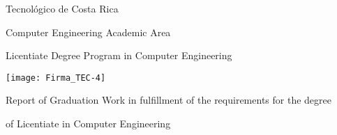 
\thispagestyle{empty} 

\begin{center}

Tecnológico de Costa Rica

\par\vspace{1ex}

Computer Engineering Academic Area

\par\vspace{1ex}

Licentiate Degree Program in Computer Engineering

\par\vspace{20mm}

\texttt{[image: Firma\_TEC-4]}

\par\vspace*{\fill}

{\large\bf{\thesisTitle}}

\par\vspace*{\fill}

Report of Graduation Work in fulfillment of the requirements for the degree

of Licentiate in Computer Engineering

\par\vspace{20mm}

\thesisAuthor

\vspace*{\fill}

\end{center}
\newpage 
\cleardoublepage 


